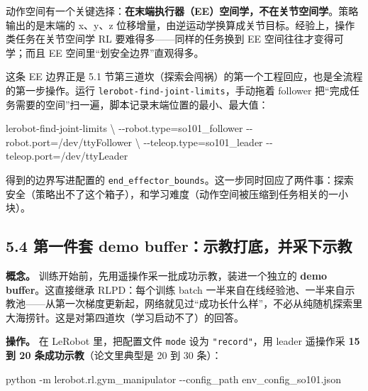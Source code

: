 \documentclass[
  chinese,
]{ctexart}
\newenvironment{Shaded}{\begin{snugshade}}{\end{snugshade}}
\newcommand{\AttributeTok}[1]{\textcolor[rgb]{0.40,0.45,0.13}{#1}}
\newcommand{\DataTypeTok}[1]{\textcolor[rgb]{0.68,0.00,0.00}{#1}}
\newcommand{\ExtensionTok}[1]{\textcolor[rgb]{0.00,0.23,0.31}{#1}}
\newcommand{\NormalTok}[1]{\textcolor[rgb]{0.00,0.23,0.31}{#1}}
\newcommand{\OperatorTok}[1]{\textcolor[rgb]{0.37,0.37,0.37}{#1}}
\begin{document}
动作空间有一个关键选择：\textbf{在末端执行器（EE）空间学，不在关节空间学}。策略输出的是末端的
x、y、z
位移增量，由逆运动学换算成关节目标。经验上，操作类任务在关节空间学 RL
要难得多------同样的任务换到 EE 空间往往才变得可学；而且 EE
空间里``划安全边界''直观得多。

这条 EE 边界正是 5.1
节第三道坎（探索会闯祸）的第一个工程回应，也是全流程的第一步操作。运行
\texttt{lerobot-find-joint-limits}，手动拖着 follower
把``完成任务需要的空间''扫一遍，脚本记录末端位置的最小、最大值：

\begin{Shaded}
\begin{Highlighting}[]
\ExtensionTok{lerobot{-}find{-}joint{-}limits} \DataTypeTok{\textbackslash{}}
  \AttributeTok{{-}{-}robot.type}\OperatorTok{=}\NormalTok{so101\_follower }\AttributeTok{{-}{-}robot.port}\OperatorTok{=}\NormalTok{/dev/ttyFollower }\DataTypeTok{\textbackslash{}}
  \AttributeTok{{-}{-}teleop.type}\OperatorTok{=}\NormalTok{so101\_leader }\AttributeTok{{-}{-}teleop.port}\OperatorTok{=}\NormalTok{/dev/ttyLeader}
\end{Highlighting}
\end{Shaded}

得到的边界写进配置的
\texttt{end\_effector\_bounds}。这一步同时回应了两件事：探索安全（策略出不了这个箱子），和学习难度（动作空间被压缩到任务相关的一小块）。

\subsection{5.4 第一件套 demo
buffer：示教打底，并采下示教}\label{ux7b2cux4e00ux4ef6ux5957-demo-bufferux793aux6559ux6253ux5e95ux5e76ux91c7ux4e0bux793aux6559}

\textbf{概念。} 训练开始前，先用遥操作采一批成功示教，装进一个独立的
\textbf{demo buffer}。这直接继承 RLPD：每个训练 batch
一半来自在线经验池、一半来自示教池------从第一次梯度更新起，网络就见过``成功长什么样''，不必从纯随机探索里大海捞针。这是对第四道坎（学习启动不了）的回答。

\textbf{操作。} 在 LeRobot 里，把配置文件 \texttt{mode} 设为
\texttt{"record"}，用 leader 遥操作采 \textbf{15 到 20
条成功示教}（论文里典型是 20 到 30 条）：

\begin{Shaded}
\begin{Highlighting}[]
\ExtensionTok{python} \AttributeTok{{-}m}\NormalTok{ lerobot.rl.gym\_manipulator }\AttributeTok{{-}{-}config\_path}\NormalTok{ env\_config\_so101.json}
\end{Highlighting}
\end{Shaded}
\end{document}
